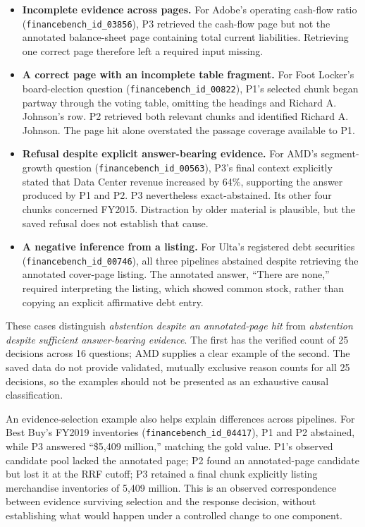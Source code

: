 \begin{itemize}
\item \textbf{Incomplete evidence across pages.} For Adobe's operating
cash-flow ratio (\texttt{financebench\_id\_03856}), P3 retrieved the cash-flow
page but not the annotated balance-sheet page containing total current
liabilities. Retrieving one correct page therefore left a required input
missing.
\item \textbf{A correct page with an incomplete table fragment.} For Foot
Locker's board-election question (\texttt{financebench\_id\_00822}), P1's
selected chunk began partway through the voting table, omitting the headings
and Richard A. Johnson's row. P2 retrieved both relevant chunks and identified
Richard A. Johnson. The page hit alone overstated the passage coverage
available to P1.
\item \textbf{Refusal despite explicit answer-bearing evidence.} For AMD's
segment-growth question (\texttt{financebench\_id\_00563}), P3's final context
explicitly stated that Data Center revenue increased by 64\%, supporting the
answer produced by P1 and P2. P3 nevertheless exact-abstained. Its other four
chunks concerned FY2015. Distraction by older material is plausible, but the
saved refusal does not establish that cause.
\item \textbf{A negative inference from a listing.} For Ulta's registered
debt securities (\texttt{financebench\_id\_00746}), all three pipelines
abstained despite retrieving the annotated cover-page listing. The annotated
answer, ``There are none,'' required interpreting the listing, which showed
common stock, rather than copying an explicit affirmative debt entry.
\end{itemize}

These cases distinguish \emph{abstention despite an annotated-page hit} from
\emph{abstention despite sufficient answer-bearing evidence}. The first has
the verified count of 25 decisions across 16 questions; AMD supplies a clear
example of the second. The saved data do not provide validated, mutually
exclusive reason counts for all 25 decisions, so the examples should not be
presented as an exhaustive causal classification.

An evidence-selection example also helps explain differences across pipelines.
For Best Buy's FY2019 inventories
(\texttt{financebench\_id\_04417}), P1 and P2 abstained, while P3 answered
``\$5,409 million,'' matching the gold value. P1's observed candidate pool
lacked the annotated page; P2 found an annotated-page candidate but lost it
at the RRF cutoff; P3 retained a final chunk explicitly listing merchandise
inventories of 5,409 million. This is an observed correspondence between
evidence surviving selection and the response decision, without establishing
what would happen under a controlled change to one component.

